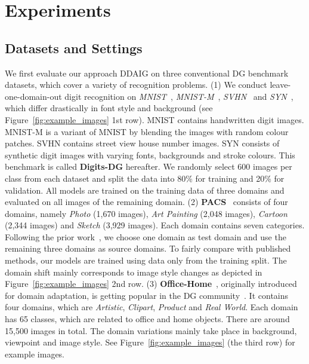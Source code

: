 \documentclass[letterpaper]{article}
\begin{document}
\section{Experiments} \label{sec:experiments}

\subsection{Datasets and Settings}
We first evaluate our approach DDAIG on three conventional DG benchmark datasets, which cover a variety of recognition problems.
(1) We conduct leave-one-domain-out digit recognition on \emph{MNIST}~\cite{lecun1998mnist}, \emph{MNIST-M}~\cite{ganin2015unsupervised}, \emph{SVHN}~\cite{netzer2011svhn} and \emph{SYN}~\cite{ganin2015unsupervised}, which differ drastically in font style and background (see Figure~\ref{fig:example_images} 1st row). MNIST contains handwritten digit images. MNIST-M is a variant of MNIST by blending the images with random colour patches. SVHN contains street view house number images. SYN consists of synthetic digit images with varying fonts, backgrounds and stroke colours. This benchmark is called \textbf{Digits-DG} hereafter. We randomly select 600 images per class from each dataset and split the data into 80\% for training and 20\% for validation. All models are trained on the training data of three domains and evaluated on all images of the remaining domain.
(2) \textbf{PACS}~\cite{li2017deeper} consists of four domains, namely \emph{Photo} (1,670 images), \emph{Art Painting} (2,048 images), \emph{Cartoon} (2,344 images) and \emph{Sketch} (3,929 images). Each domain contains seven categories. Following the prior work~\cite{li2017deeper,cvpr19JiGen,li2019episodic}, we choose one domain as test domain and use the remaining three domains as source domains. To fairly compare with published methods, our models are trained using data only from the training split. The domain shift mainly corresponds to image style changes as depicted in Figure~\ref{fig:example_images} 2nd row.
(3) \textbf{Office-Home}~\cite{office_home}, originally introduced for domain adaptation, is getting popular in the DG community~\cite{d2018domain,cvpr19JiGen}. It contains four domains, which are \emph{Artistic}, \emph{Clipart}, \emph{Product} and \emph{Real World}. Each domain has 65 classes, which are related to office and home objects. There are around 15,500 images in total. The domain variations mainly take place in background, viewpoint and image style. See Figure~\ref{fig:example_images} (the third row) for example images.
\end{document}
